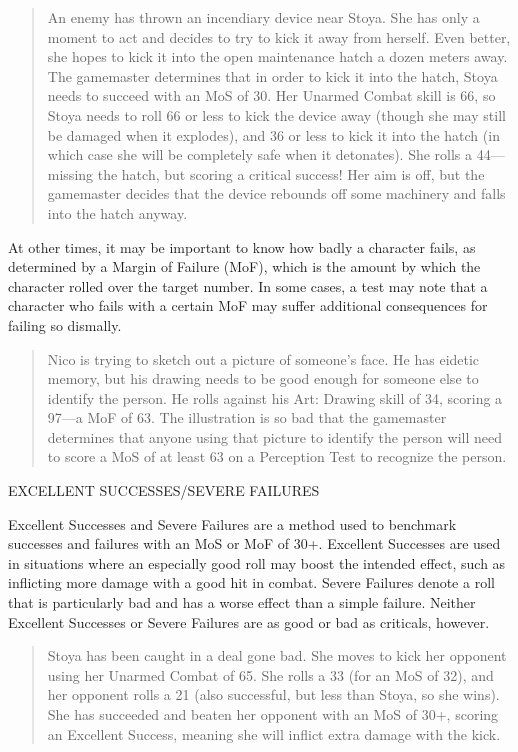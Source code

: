 \begin{quotation}
  An enemy has thrown an incendiary device near Stoya. She has only a
  moment to act and decides to try to kick it away from herself. Even
  better, she hopes to kick it into the open maintenance hatch a dozen
  meters away. The gamemaster determines that in order to kick it into
  the hatch, Stoya needs to succeed with an MoS of 30. Her Unarmed
  Combat skill is 66, so Stoya needs to roll 66 or less to kick the
  device away (though she may still be damaged when it explodes), and
  36 or less to kick it into the hatch (in which case she will be
  completely safe when it detonates). She rolls a 44—missing the
  hatch, but scoring a critical success! Her aim is off, but the
  gamemaster decides that the device rebounds off some machinery and
  falls into the hatch anyway.
\end{quotation}

At other times, it may be important to know how
badly a character fails, as determined by a Margin
of Failure (MoF), which is the amount by which the
character rolled over the target number. In some cases,
a test may note that a character who fails with a
certain MoF may suffer additional consequences for
failing so dismally.

\begin{quotation}
  Nico is trying to sketch out a picture of someone's face. He has
  eidetic memory, but his drawing needs to be good enough for someone
  else to identify the person. He rolls against his Art: Drawing skill
  of 34, scoring a 97—a MoF of 63. The illustration is so bad that the
  gamemaster determines that anyone using that picture to identify the
  person will need to score a MoS of at least 63 on a Perception Test
  to recognize the person.
\end{quotation}

EXCELLENT SUCCESSES/SEVERE FAILURES

Excellent Successes and Severe Failures are a method
used to benchmark successes and failures with an
MoS or MoF of 30+. Excellent Successes are used in
situations where an especially good roll may boost the
intended effect, such as inflicting more damage with
a good hit in combat. Severe Failures denote a roll
that is particularly bad and has a worse effect than a
simple failure. Neither Excellent Successes or Severe
Failures are as good or bad as criticals, however.

\begin{quotation}
  Stoya has been caught in a deal gone bad. She moves to kick her
  opponent using her Unarmed Combat of 65. She rolls a 33 (for an MoS
  of 32), and her opponent rolls a 21 (also successful, but less than
  Stoya, so she wins). She has succeeded and beaten her opponent with
  an MoS of 30+, scoring an Excellent Success, meaning she will
  inflict extra damage with the kick.
\end{quotation}

